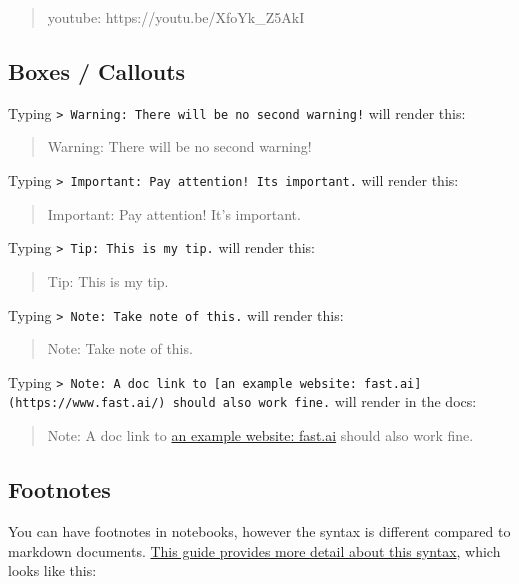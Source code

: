 \documentclass[11pt]{article}
\begin{document}
\begin{quote}
youtube: https://youtu.be/XfoYk\_Z5AkI
\end{quote}

    \hypertarget{boxes-callouts}{%
\subsection{Boxes / Callouts}\label{boxes-callouts}}

Typing
\texttt{\textgreater{}\ Warning:\ There\ will\ be\ no\ second\ warning!}
will render this:

\begin{quote}
Warning: There will be no second warning!
\end{quote}

Typing
\texttt{\textgreater{}\ Important:\ Pay\ attention!\ It\textquotesingle{}s\ important.}
will render this:

\begin{quote}
Important: Pay attention! It's important.
\end{quote}

Typing \texttt{\textgreater{}\ Tip:\ This\ is\ my\ tip.} will render
this:

\begin{quote}
Tip: This is my tip.
\end{quote}

Typing \texttt{\textgreater{}\ Note:\ Take\ note\ of\ this.} will render
this:

\begin{quote}
Note: Take note of this.
\end{quote}

Typing
\texttt{\textgreater{}\ Note:\ A\ doc\ link\ to\ {[}an\ example\ website:\ fast.ai{]}(https://www.fast.ai/)\ should\ also\ work\ fine.}
will render in the docs:

\begin{quote}
Note: A doc link to \href{https://www.fast.ai/}{an example website:
fast.ai} should also work fine.
\end{quote}

    \hypertarget{footnotes}{%
\subsection{Footnotes}\label{footnotes}}

You can have footnotes in notebooks, however the syntax is different
compared to markdown documents.
\href{https://github.com/fastai/fastpages/blob/master/_fastpages_docs/NOTEBOOK_FOOTNOTES.md}{This
guide provides more detail about this syntax}, which looks like this:
\end{document}
